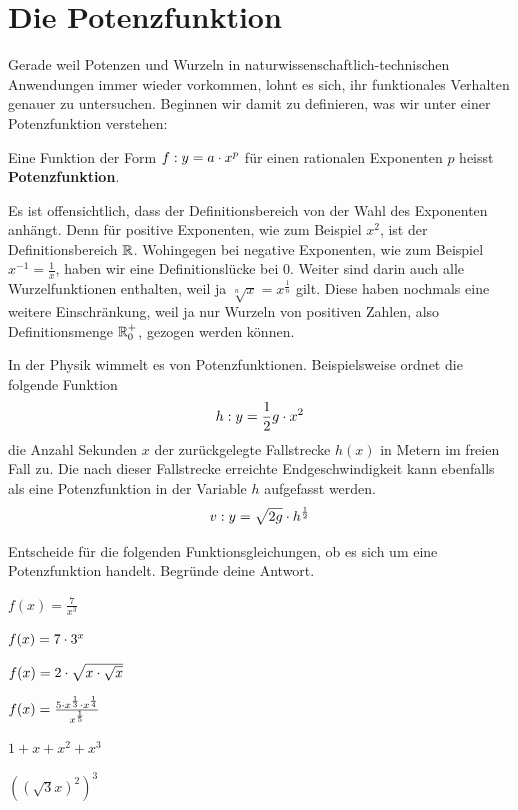 \documentclass[11pt,oneside]{article}
\begin{document}
\newpage
\section{Die Potenzfunktion}
	Gerade weil Potenzen und Wurzeln in naturwissenschaftlich-technischen Anwendungen immer wieder vorkommen, lohnt es sich, ihr funktionales Verhalten genauer zu untersuchen. Beginnen wir damit zu definieren, was wir unter einer Potenzfunktion verstehen:
	\begin{definition}
		Eine Funktion der Form $f:y=a\cdot x^p$ für einen rationalen Exponenten $p$ heisst \textbf{Potenzfunktion}.
	\end{definition}
	Es ist offensichtlich, dass der Definitionsbereich von der Wahl des Exponenten anhängt. Denn für positive Exponenten, wie zum Beispiel $x^2$, ist der Definitionsbereich $\mathbb{R}$. Wohingegen bei negative Exponenten, wie zum Beispiel $x^{-1}=\frac{1}{x}$, haben wir eine Definitionslücke bei $0$. Weiter sind darin auch alle Wurzelfunktionen enthalten, weil ja $\sqrt[n]{x}=x^\frac{1}{n}$ gilt. Diese haben nochmals eine weitere Einschränkung, weil ja nur Wurzeln von positiven Zahlen, also Definitionsmenge $\mathbb{R}_0^+$, gezogen werden können.
	\begin{beispiel}
		In der Physik wimmelt es von Potenzfunktionen. Beispielsweise ordnet die folgende Funktion \[h:y=\frac{1}{2}g\cdot x^2\] die Anzahl Sekunden $x$ der zurückgelegte Fallstrecke $h(x)$ in Metern im freien Fall zu.\vspace{11pt}\newline
		Die nach dieser Fallstrecke erreichte Endgeschwindigkeit kann ebenfalls als eine Potenzfunktion in der Variable $h$ aufgefasst werden. \[v:y=\sqrt{2g}\cdot h^\frac{1}{2}\]
	\end{beispiel}
	\begin{aufgabe}
		Entscheide für die folgenden Funktionsgleichungen, ob es sich um eine Potenzfunktion handelt. Begründe deine Antwort.
		\begin{enumcols}[3]
			\item $f(x)=\frac{7}{x^3}$
			\item $f(x)=7\cdot3^x$
			\item $f(x)=2\cdot\sqrt{x\cdot\sqrt{x}}$
			\item $f(x)=\frac{5\cdot x^\frac{1}{3}\cdot x^\frac{1}{4}}{x^\frac{1}{5}}$
			\item $1+x+x^2+x^3$
			\item $\left(\left(\sqrt{3}x\right)^2\right)^3$
		\end{enumcols}
	\end{aufgabe}
\end{document}
